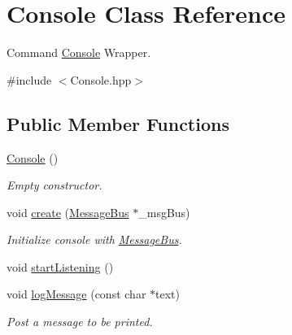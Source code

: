 \hypertarget{class_console}{}\section{Console Class Reference}
\label{class_console}


Command \mbox{\hyperlink{class_console}{Console}} Wrapper.  




{\ttfamily \#include $<$Console.\+hpp$>$}

\subsection*{Public Member Functions}
\begin{DoxyCompactItemize}
\item 
\mbox{\label{class_console_aba16cfd9f0894eb1312b1bc1155b6646}} 
\mbox{\hyperlink{class_console_aba16cfd9f0894eb1312b1bc1155b6646}{Console}} ()
\begin{DoxyCompactList}\small\item\em Empty constructor. \end{DoxyCompactList}\item 
\mbox{\label{class_console_aac554a002159d86aaa63811da268224a}} 
void \mbox{\hyperlink{class_console_aac554a002159d86aaa63811da268224a}{create}} (\mbox{\hyperlink{class_message_bus}{Message\+Bus}} $\ast$\+\_\+msg\+Bus)
\begin{DoxyCompactList}\small\item\em Initialize console with \mbox{\hyperlink{class_message_bus}{Message\+Bus}}. \end{DoxyCompactList}\item 
void \mbox{\hyperlink{class_console_a6bd41db211cca0b244841a9e788aee3c}{start\+Listening}} ()
\item 
\mbox{\label{class_console_af56253eda0e27d95fbbc2ac024110676}} 
void \mbox{\hyperlink{class_console_af56253eda0e27d95fbbc2ac024110676}{log\+Message}} (const char $\ast$text)
\begin{DoxyCompactList}\small\item\em Post a message to be printed. \end{DoxyCompactList}\item 
\mbox{\label{class_console_aa003eda272ee1a7fd9ca2431540871c3}} 

\end{DoxyCompactItemize}
